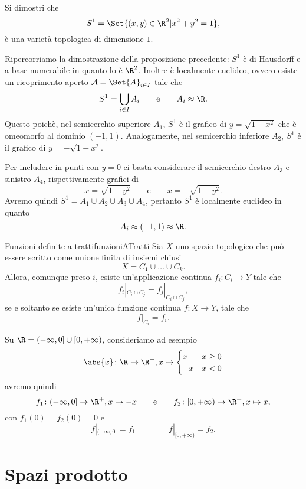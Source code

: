\begin{ese}
	Si dimostri che
	\[
		S^1=\Set{(x,y)\in\R^2 | x^2+y^2=1},
	\]
	è una varietà topologica di dimensione \(1\).
\end{ese}

\begin{sol}
	Ripercorriamo la dimostrazione della proposizione precedente:
	\(S^1\) è di Hausdorff e a base numerabile in quanto lo è \(\R^2\).
	Inoltre è localmente euclideo, ovvero esiste un ricoprimento aperto \(\mathcal{A}=\Set{A}_{i\in I}\) tale che
	\[
		S^1=\bigcup_{i\in I}A_i \qquad\text{e}\qquad A_i\approx \R.
	\]
	Questo poichè, nel semicerchio superiore \(A_1\), \(S^1\) è il grafico di \(y=\sqrt{1-x^2}\) che è omeomorfo al dominio \((-1,1)\).
	Analogamente, nel semicerchio inferiore \(A_2\), \(S^1\) è il grafico di \(y=-\sqrt{1-x^2}\).

	Per includere in punti con \(y=0\) ci basta considerare il semicerchio destro \(A_3\) e sinistro \(A_4\), rispettivamente grafici di
	\[
		x=\sqrt{1-y^2}\qquad\text{e}\qquad x=-\sqrt{1-y^2}.
	\]
	Avremo quindi \(S^1=A_1\cup A_2\cup A_3\cup A_4\), pertanto \(S^1\) è localmente euclideo in quanto
	\[
		A_i\approx (-1,1)\approx \R.
	\]
\end{sol}

\begin{prop}{Funzioni definite a tratti}{funzioniATratti}
	Sia \(X\) uno spazio topologico che può essere scritto come unione finita di insiemi chiusi
	\[
		X=C_1 \cup \ldots \cup C_k.
	\]
	Allora, comunque preso \(i\), esiste un'applicazione continua \(f_i\colon C_i\to Y\) tale che
	\[
		f_i|_{C_i \cap C_j}=f_j|_{C_i \cap C_j},
	\]
	se e soltanto se esiste un'unica funzione continua \(f\colon X\to Y\), tale che
	\[
		f|_{C_i}=f_i.
	\]
\end{prop}

\begin{ese}
	Su \(\R=(-\infty,0]\cup [0,+\infty)\), consideriamo ad esempio
	\[
		\abs{x}\colon\R\to\R^+,x\mapsto \begin{cases}
			x  & x \ge 0 \\
			-x & x < 0
		\end{cases}
	\]
	avremo quindi
	\[
		f_1\colon(-\infty,0]\to \R^+,x\mapsto -x \qquad\text{e}\qquad f_2\colon [0,+\infty)\to\R^+,x\mapsto x,
	\]
	con \(f_1(0)=f_2(0)=0\) e
	\[
		f|_{(-\infty,0]}=f_1 \qquad \qquad f|_{[0,+\infty)}=f_2.
	\]
\end{ese}
\section{Spazi prodotto}

